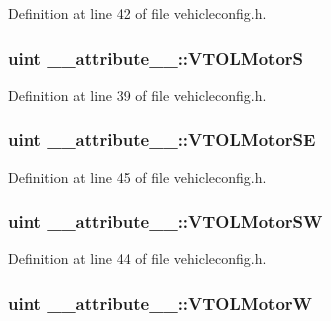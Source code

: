 Definition at line 42 of file vehicleconfig.\-h.

\hypertarget{group___config_plugin_ga454ee04b612bfb51636328cac0ecb30c}{
\subsubsection[{V\-T\-O\-L\-Motor\-S}]{\setlength{\rightskip}{0pt plus 5cm}uint \-\_\-\-\_\-attribute\-\_\-\-\_\-\-::\-V\-T\-O\-L\-Motor\-S}}\label{group___config_plugin_ga454ee04b612bfb51636328cac0ecb30c}


Definition at line 39 of file vehicleconfig.\-h.

\hypertarget{group___config_plugin_gaa954495952cf0b6ae1f8a25d95ca09c0}{
\subsubsection[{V\-T\-O\-L\-Motor\-S\-E}]{\setlength{\rightskip}{0pt plus 5cm}uint \-\_\-\-\_\-attribute\-\_\-\-\_\-\-::\-V\-T\-O\-L\-Motor\-S\-E}}\label{group___config_plugin_gaa954495952cf0b6ae1f8a25d95ca09c0}


Definition at line 45 of file vehicleconfig.\-h.

\hypertarget{group___config_plugin_ga6c7dfd25d7944b3ce84871fed9c6c9ef}{
\subsubsection[{V\-T\-O\-L\-Motor\-S\-W}]{\setlength{\rightskip}{0pt plus 5cm}uint \-\_\-\-\_\-attribute\-\_\-\-\_\-\-::\-V\-T\-O\-L\-Motor\-S\-W}}\label{group___config_plugin_ga6c7dfd25d7944b3ce84871fed9c6c9ef}


Definition at line 44 of file vehicleconfig.\-h.

\hypertarget{group___config_plugin_ga702b69e8ffd06d1a761e28540e0706c0}{
\subsubsection[{V\-T\-O\-L\-Motor\-W}]{\setlength{\rightskip}{0pt plus 5cm}uint \-\_\-\-\_\-attribute\-\_\-\-\_\-\-::\-V\-T\-O\-L\-Motor\-W}}\label{group___config_plugin_ga702b69e8ffd06d1a761e28540e0706c0}


